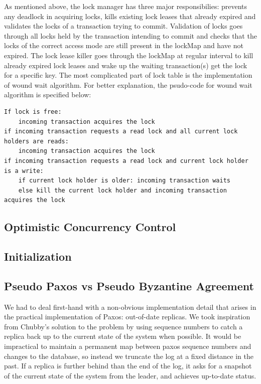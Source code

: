 \documentclass[10pt,twocolumn]{article}
\begin{document}
As mentioned above, the lock manager has three major responsibilies: prevents any deadlock in acquiring locks, kills existing lock leases that already expired and validates the locks of a transaction trying to commit. Validation of locks goes through all locks held by the transaction intending to commit and checks that the locks of the correct access mode are still present in the lockMap and have not expired. The lock lease killer goes through the lockMap at regular interval to kill already expired lock leases and wake up the waiting transaction(s) get the lock for a specific key. The most complicated part  of lock table is the implementation of wound wait algorithm. For better explanation, the psudo-code for wound wait algorithm is specified below:
\begin{lstlisting}
If lock is free:
	incoming transaction acquires the lock
if incoming transaction requests a read lock and all current lock holders are reads:
	incoming transaction acquires the lock	
if incoming transaction requests a read lock and current lock holder is a write:
	if current lock holder is older: incoming transaction waits
	else kill the current lock holder and incoming transaction acquires the lock

\end{lstlisting}

\subsection{Optimistic Concurrency Control}

\subsection{Initialization}

\subsection{Pseudo Paxos vs Pseudo Byzantine Agreement}

We had to deal first-hand with a non-obvious implementation detail that arises in the practical implementation of Paxos: out-of-date replicas. We took inspiration from Chubby's solution to the problem  \cite{chandra_paxos_2007} by using sequence numbers to catch a replica back up to the current state of the system when possible. It would be impractical to maintain a permanent map between paxos sequence numbers and changes to the database, so instead we truncate the log at a fixed distance in the past. If a replica is further behind than the end of the log, it asks for a snapshot of the current state of the system from the leader, and achieves up-to-date status.
  
\end{document}
